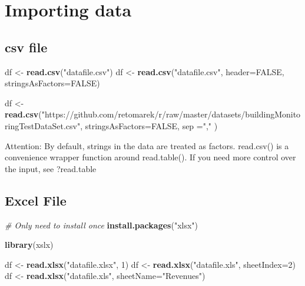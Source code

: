 \documentclass[
]{book}
\newenvironment{Shaded}{\begin{snugshade}}{\end{snugshade}}
\newcommand{\CommentTok}[1]{\textcolor[rgb]{0.56,0.35,0.01}{\textit{#1}}}
\newcommand{\DataTypeTok}[1]{\textcolor[rgb]{0.13,0.29,0.53}{#1}}
\newcommand{\DecValTok}[1]{\textcolor[rgb]{0.00,0.00,0.81}{#1}}
\newcommand{\KeywordTok}[1]{\textcolor[rgb]{0.13,0.29,0.53}{\textbf{#1}}}
\newcommand{\NormalTok}[1]{#1}
\newcommand{\OtherTok}[1]{\textcolor[rgb]{0.56,0.35,0.01}{#1}}
\newcommand{\StringTok}[1]{\textcolor[rgb]{0.31,0.60,0.02}{#1}}
\begin{document}
\hypertarget{importing-data}{%
\section{Importing data}\label{importing-data}}

\hypertarget{csv-file}{%
\subsection{csv file}\label{csv-file}}

\begin{Shaded}
\begin{Highlighting}[]
\NormalTok{df <-}\StringTok{ }\KeywordTok{read.csv}\NormalTok{(}\StringTok{"datafile.csv"}\NormalTok{)}
\NormalTok{df <-}\StringTok{ }\KeywordTok{read.csv}\NormalTok{(}\StringTok{"datafile.csv"}\NormalTok{, }\DataTypeTok{header=}\OtherTok{FALSE}\NormalTok{, }\DataTypeTok{stringsAsFactors=}\OtherTok{FALSE}\NormalTok{)}
\end{Highlighting}
\end{Shaded}

\begin{Shaded}
\begin{Highlighting}[]
\NormalTok{df <-}\StringTok{ }\KeywordTok{read.csv}\NormalTok{(}\StringTok{"https://github.com/retomarek/r/raw/master/datasets/buildingMonitoringTestDataSet.csv"}\NormalTok{, }\DataTypeTok{stringsAsFactors=}\OtherTok{FALSE}\NormalTok{, }\DataTypeTok{sep =}\StringTok{","}\NormalTok{ )}
\end{Highlighting}
\end{Shaded}

Attention: By default, strings in the data are treated as factors.
read.csv() is a convenience wrapper function around read.table(). If you need more control over the input, see ?read.table

\hypertarget{excel-file}{%
\subsection{Excel File}\label{excel-file}}

\begin{Shaded}
\begin{Highlighting}[]
\CommentTok{# Only need to install once}
\KeywordTok{install.packages}\NormalTok{(}\StringTok{"xlsx"}\NormalTok{)}

\KeywordTok{library}\NormalTok{(xslx)}

\NormalTok{df <-}\StringTok{ }\KeywordTok{read.xlsx}\NormalTok{(}\StringTok{"datafile.xlsx"}\NormalTok{, }\DecValTok{1}\NormalTok{)}
\NormalTok{df <-}\StringTok{ }\KeywordTok{read.xlsx}\NormalTok{(}\StringTok{"datafile.xls"}\NormalTok{, }\DataTypeTok{sheetIndex=}\DecValTok{2}\NormalTok{)}
\NormalTok{df <-}\StringTok{ }\KeywordTok{read.xlsx}\NormalTok{(}\StringTok{"datafile.xls"}\NormalTok{, }\DataTypeTok{sheetName=}\StringTok{"Revenues"}\NormalTok{)}
\end{Highlighting}
\end{Shaded}
\end{document}
